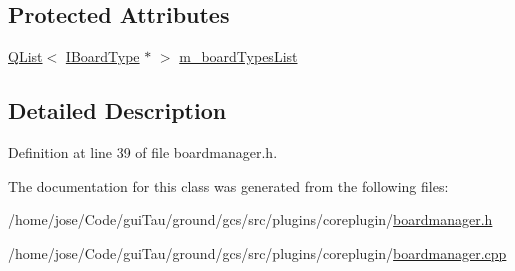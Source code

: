 \subsection*{Protected Attributes}
\begin{DoxyCompactItemize}
\item 
\hyperlink{class_q_list}{Q\-List}$<$ \hyperlink{class_core_1_1_i_board_type}{I\-Board\-Type} $\ast$ $>$ \hyperlink{group___core_plugin_ga0a7a3ac9ac181c79d4eb14940fe8bd4f}{m\-\_\-board\-Types\-List}
\end{DoxyCompactItemize}


\subsection{Detailed Description}


Definition at line 39 of file boardmanager.\-h.



The documentation for this class was generated from the following files\-:\begin{DoxyCompactItemize}
\item 
/home/jose/\-Code/gui\-Tau/ground/gcs/src/plugins/coreplugin/\hyperlink{boardmanager_8h}{boardmanager.\-h}\item 
/home/jose/\-Code/gui\-Tau/ground/gcs/src/plugins/coreplugin/\hyperlink{boardmanager_8cpp}{boardmanager.\-cpp}\end{DoxyCompactItemize}
